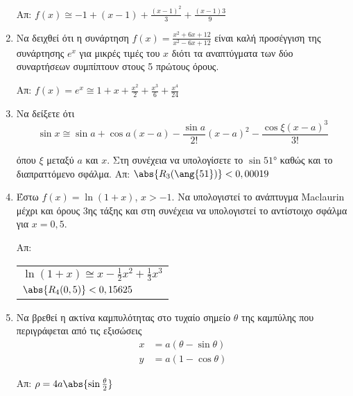 \begin{enumerate}
    \hfill Απ: $f(x) \cong -1 + (x-1) + \frac{(x-1)^{2}}{3} +
    \frac{(x-1){3}}{9}$

  \item Να δειχθεί ότι η συνάρτηση $ f(x) = \frac{x^{2} + 6x + 12}{x^{2} - 6x
    + 12} $ είναι καλή προσέγγιση της συνάρτησης $ e^{x} $ για μικρές τιμές
    του $x$ διότι τα αναπτύγματα των δύο συναρτήσεων συμπίπτουν στους 5
    πρώτους όρους. 

    \hfill Απ: $ f(x) = e^{x} \cong 1 + x + \frac{x^{2}}{2} +
    \frac{x^{3}}{6} + \frac{x^{4}}{24} $

  \item Να δείξετε ότι 
    \[
      \sin{x} \cong \sin{a} + \cos{a} (x-a) - \frac{\sin{a}}{2!} (x-a)^{2} -
      \frac{\cos{\xi} (x-a)^{3}}{3!}
    \]

    όπου $\xi$ μεταξύ $a$ και $x$. Στη συνέχεια να υπολογίσετε το $
    \sin{\ang{51}}$ καθώς και το διαπραττόμενο σφάλμα.
    \hfill Απ: $ \abs{R_{3}(\ang{51})} < 0,00019 $

  \item Έστω $ f(x) = \ln{(1+x)} $, $ x>-1 $. Να υπολογιστεί το ανάπτυγμα
    Maclaurin μέχρι και όρους 3ης τάξης και στη συνέχεια να
    υπολογιστεί το αντίστοιχο σφάλμα για $ x = 0,5 $.

    \hfill Απ: \begin{tabular}{l}
      $ \ln(1+x) \cong x - \frac{1}{2} x^{2} + \frac{1}{3}x^{3} $ \\
      $ \abs{R_{4}(0,5)} < 0,15625 $	
    \end{tabular}

  \item Να βρεθεί η ακτίνα καμπυλότητας στο τυχαίο σημείο $\theta$ της
    καμπύλης που περιγράφεται από τις εξισώσεις 
    \begin{align*}
      x &= a(\theta - \sin{\theta}) \\
      y &= a(1 - \cos{\theta})
    \end{align*}		

    \hfill Απ: $ \rho = 4a \abs{\sin{\frac{\theta}{2}}} $
\end{enumerate}



